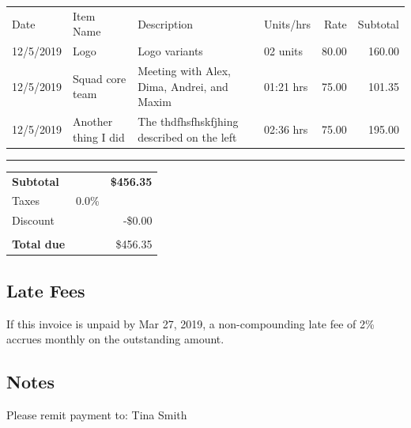 \documentclass[10pt]{article}
\begin{document}
\hspace{-5pt}\begin{tabular}{llp{.4\linewidth}lrr}
   \rowcolor{slightlylightergray}  Date & Item Name & Description & Units/hrs & Rate & Subtotal \\
    12/5/2019 & Logo & Logo variants    & 02 units & 80.00 & 160.00\\
    12/5/2019 & Squad core team & Meeting with Alex, Dima, Andrei, and Maxim & 01:21 hrs & 75.00 & 101.35 \\
    12/5/2019 & Another thing I did & The thdfhsfhskfjhing described on the left & 02:36 hrs & 75.00 & 195.00
\end{tabular}
\vspace{20pt}
\hrule

\hfill \begin{tabular}{llr}
    \textbf{Subtotal} && \textbf{\$456.35}\\
    Taxes   & 0.0\% \\
    Discount && -\$0.00 \\
    \hline\\
    \textbf{Total due} && {\color{red} \$456.35}
\end{tabular}

\subsection*{\color{lightgray} Late Fees}
If this invoice is unpaid by Mar 27, 2019, a non-compounding late fee of 2\% accrues monthly on the outstanding amount.

\subsection*{\color{lightgray} Notes}
Please remit payment to: Tina Smith
\end{document}
